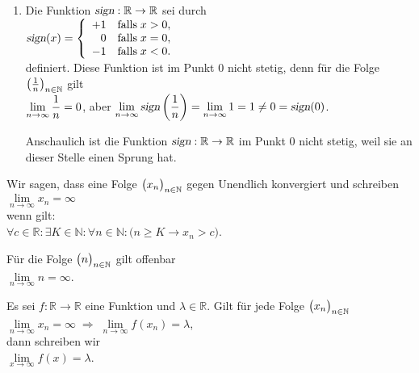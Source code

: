 \begin{enumerate}
\item Die Funktion $\textsl{sign}:\mathbb{R} \rightarrow \mathbb{R}$ sei durch
      \\[0.2cm]
      \hspace*{1.3cm}      
      $\textsl{sign}(x) = \left\{
       \begin{array}{rl}
        +1 & \mbox{falls}\; x > 0, \\
         0 & \mbox{falls}\; x = 0, \\
        -1 & \mbox{falls}\; x < 0. \\
       \end{array}\right.
      $
      \\[0.2cm]
      definiert. Diese Funktion ist im Punkt $0$ nicht stetig, denn f\"ur die Folge
      $\bigl(\frac{1}{n}\bigr)_{n\in\mathbb{N}}$ gilt
      \\[0.2cm]
      \hspace*{1.3cm}      
      $\displaystyle \lim\limits_{n\rightarrow\infty} \frac{1}{n} = 0$, \quad aber \quad
      $\displaystyle \lim\limits_{n\rightarrow\infty} \textsl{sign}\left(\frac{1}{n}\right) =
       \lim\limits_{n\rightarrow\infty} 1 = 1 \not= 0 = \textsl{sign}(0)$. 

       Anschaulich ist die Funktion $\textsl{sign}:\mathbb{R} \rightarrow \mathbb{R}$  im Punkt
       0 nicht stetig, weil sie an dieser Stelle einen Sprung hat.
       \eox
\end{enumerate}

\begin{Definition}
Wir sagen, dass eine Folge  $\bigl(x_n\bigr)_{n\in\mathbb{N}}$ gegen Unendlich konvergiert und schreiben 
\\[0.2cm]
\hspace*{1.3cm}      
$\lim\limits_{n\rightarrow\infty} x_n = \infty$
\\[0.2cm]
wenn gilt:
\\[0.2cm]
\hspace*{1.3cm}      
$\forall c \in \mathbb{R}: \exists K \in \mathbb{N}: \forall n \in \mathbb{N}: \bigl(n \geq K \rightarrow x_n > c\bigr)$.
\eod
\end{Definition}

\example  
F\"ur die Folge $\bigl(n\bigr)_{n\in\mathbb{N}}$ gilt offenbar 
\\[0.2cm]
\hspace*{1.3cm}      
$\lim\limits_{n\rightarrow\infty} n = \infty$.
\eox

\begin{Definition}
Es sei $f:\mathbb{R} \rightarrow \mathbb{R}$ eine Funktion und $\lambda\in \mathbb{R}$.
Gilt f\"ur jede Folge $\bigl(x_n\bigr)_{n\in\mathbb{N}}$
\\[0.2cm]
\hspace*{1.3cm}      
$\lim\limits_{n\rightarrow\infty} x_n = \infty \;\Rightarrow\;
     \lim\limits_{n\rightarrow\infty} f(x_n) = \lambda$,
\\[0.2cm]
dann schreiben wir 
\\[0.2cm]
\hspace*{1.3cm}      
$\lim\limits_{x\rightarrow\infty} f(x) = \lambda$.
\eod
\end{Definition}

